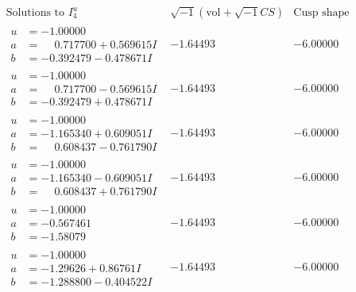 \documentclass[1p]{elsarticle_modified}
\theoremstyle{definition}
\newcommand{\I}{\sqrt{-1}}
\begin{document}
$$\begin{array}{c|c|c}  
\text{Solutions to }I^u_{4}& \I (\text{vol} + \sqrt{-1}CS) & \text{Cusp shape}\\
 \hline 
\begin{aligned}
u &= -1.00000\phantom{ +0.000000I} \\
a &= \phantom{-}0.717700 + 0.569615 I \\
b &= -0.392479 - 0.478671 I\end{aligned}
 & -1.64493\phantom{ +0.000000I} & -6.00000\phantom{ +0.000000I} \\ \hline\begin{aligned}
u &= -1.00000\phantom{ +0.000000I} \\
a &= \phantom{-}0.717700 - 0.569615 I \\
b &= -0.392479 + 0.478671 I\end{aligned}
 & -1.64493\phantom{ +0.000000I} & -6.00000\phantom{ +0.000000I} \\ \hline\begin{aligned}
u &= -1.00000\phantom{ +0.000000I} \\
a &= -1.165340 + 0.609051 I \\
b &= \phantom{-}0.608437 - 0.761790 I\end{aligned}
 & -1.64493\phantom{ +0.000000I} & -6.00000\phantom{ +0.000000I} \\ \hline\begin{aligned}
u &= -1.00000\phantom{ +0.000000I} \\
a &= -1.165340 - 0.609051 I \\
b &= \phantom{-}0.608437 + 0.761790 I\end{aligned}
 & -1.64493\phantom{ +0.000000I} & -6.00000\phantom{ +0.000000I} \\ \hline\begin{aligned}
u &= -1.00000\phantom{ +0.000000I} \\
a &= -0.567461\phantom{ +0.000000I} \\
b &= -1.58079\phantom{ +0.000000I}\end{aligned}
 & -1.64493\phantom{ +0.000000I} & -6.00000\phantom{ +0.000000I} \\ \hline\begin{aligned}
u &= -1.00000\phantom{ +0.000000I} \\
a &= -1.29626 + 0.86761 I \\
b &= -1.288800 - 0.404522 I\end{aligned}
 & -1.64493\phantom{ +0.000000I} & -6.00000\phantom{ +0.000000I} \\ \hline\begin{aligned}

\end{aligned}
\end{array}$$
\end{document}
